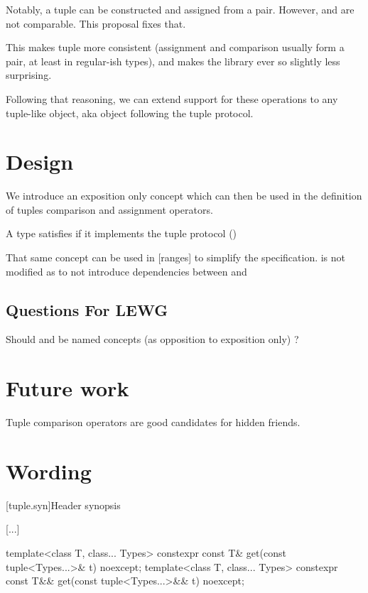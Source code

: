 \documentclass{wg21}
\begin{document}
Notably, a tuple can be constructed and assigned from a pair.
However,  and  are not comparable.
This proposal fixes that.

This makes tuple more consistent (assignment and comparison usually form a pair, at least in regular-ish types),
and makes the library ever so slightly less surprising.

Following that reasoning, we can extend support for these operations to any tuple-like object, aka object following
the tuple protocol.
 
\section{Design}

We introduce an exposition only concept  which can then be used in the definition of tuples
comparison and assignment operators.

A type satisfies  if it implements the tuple protocol ()

That same concept can be used in [ranges] to simplify the specification.
 is not modified as to not introduce dependencies between  and 

\subsection{Questions For LEWG}

Should  and  be named concepts (as opposition to exposition only) ?


\section{Future work}

Tuple comparison operators are good candidates for hidden friends. 

\section{Wording}


[tuple.syn]{Header  synopsis}

[...]
\begin{codeblock}
    
template<class T, class... Types>
constexpr const T& get(const tuple<Types...>& t) noexcept;
template<class T, class... Types>
constexpr const T&& get(const tuple<Types...>&& t) noexcept;   
\end{codeblock}
\end{document}
